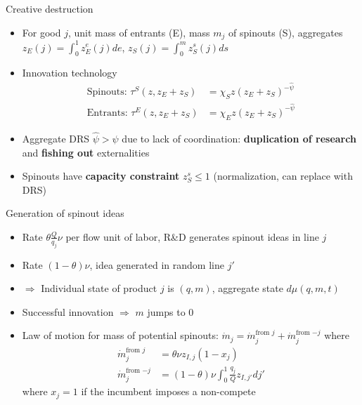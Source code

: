 \documentclass[english,usenames,dvipsnames]{beamer}
\begin{document}
\begin{frame}{Creative destruction}
\begin{itemize}
	\item For good $j$, unit mass of entrants (E), mass $m_j$ of spinouts (S), aggregates $z_E(j) = \int_0^1 z_E^e(j) de$, $z_S(j) = \int_0^{m} z_S^s(j) ds$
	\item Innovation technology
	\begin{align*}
	\textrm{Spinouts: }\tau^S(z,z_E+z_S) &= \chi_{S} z (z_E + z_S)^{-\hat{\psi}} \\
	\textrm{Entrants: }\tau^E(z,z_E+z_S) &= \chi_{E} z (z_E + z_S)^{-\hat{\psi}}
	\end{align*}
	\item Aggregate DRS $\hat{\psi} > \psi$ due to lack of coordination: \textbf{\alert{duplication of research}} and \textbf{\alert{fishing out}} externalities
	\item Spinouts have \textbf{\alert{capacity constraint}} $z_S^s \le 1$ (normalization, can replace with DRS)
\end{itemize}
\end{frame}

\begin{frame}{Generation of spinout ideas}
\begin{itemize}
\item Rate $\theta \frac{Q}{q_j} \nu$ per flow unit of labor, R\&D generates spinout ideas in line $j$
\item Rate $(1-\theta) \nu$, idea generated in random line $j'$
\item $\Rightarrow$ Individual state of product $j$ is $(q,m)$, aggregate state $d\mu(q,m,t)$
\item Successful innovation $\Rightarrow$ $m$ jumps to 0
\item Law of motion for mass of potential spinouts: $\dot{m}_j = \dot{m}_j^{\textrm{from $j$}} + \dot{m}_j^{\textrm{from $-j$}}$ where
\begin{align*}
\dot{m}_j^{\textrm{from $j$}}&= \theta \nu z_{I,j} (1-x_j)\\
\dot{m}_j^{\textrm{from $-j$}} &= (1-\theta)\nu \int_0^1 \frac{q_j}{Q} z_{I,j'} dj'
\end{align*}
where $x_j = 1$ if the incumbent imposes a non-compete
\end{itemize}
\end{frame}
\end{document}
